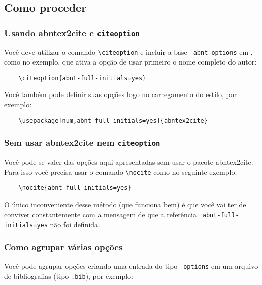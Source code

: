 \documentclass[a4paper]{ltxdoc}
\begin{document}
\subsection{Como proceder}

\subsubsection{Usando \textsf{abntex2cite} e {\tt citeoption}}

\DescribeMacro{\citeoption}
Você deve utilizar o comando \verb+\citeoption+ e incluir a base {\tt
abnt-options} em \verb++, como no exemplo, que ativa a opção de
usar primeiro o nome completo do autor:

\begin{verbatim}
    \citeoption{abnt-full-initials=yes}
\end{verbatim}

Você também pode definir suas opções logo no carregamento do estilo, por
exemplo:

\begin{verbatim}
    \usepackage[num,abnt-full-initials=yes]{abntex2cite}
\end{verbatim}

\subsubsection{Sem usar \textsf{abntex2cite} nem {\tt citeoption}}

\DescribeMacro{\nocite}
Você pode se valer das opções aqui apresentadas sem usar o pacote
\textsf{abntex2cite}. Para isso você precisa usar o comando \verb+\nocite+ como
no seguinte exemplo:

\begin{verbatim}
    \nocite{abnt-full-initials=yes}
\end{verbatim}

O único inconveniente desse método (que funciona bem) é que você vai ter de
conviver constantemente com a mensagem de que a referência {\tt
abnt-full-initials=yes} não foi definida.

\subsubsection{Como agrupar várias opções}

\DescribeMacro{\citeoption}
Você pode agrupar opções criando uma entrada do tipo {\tt \@ABNT-options}
em um arquivo de bibliografias (tipo {\tt .bib}), por exemplo:
\end{document}
